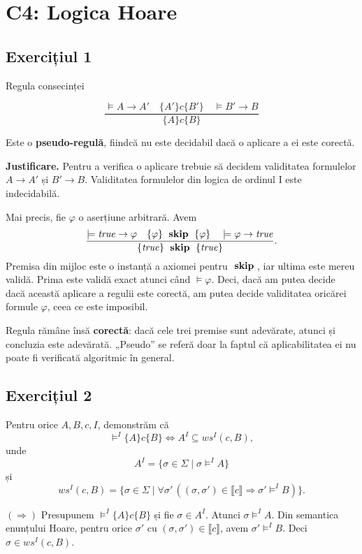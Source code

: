 \section*{C4: Logica Hoare}

\subsection{Exercițiul 1}

Regula consecinței

\[
	\frac{\models A \rightarrow A' \quad \{A'\} c \{B'\} \quad \models B' \rightarrow B}{\{A\} c \{B\}}
\]

Este o \textbf{pseudo-regulă}, fiindcă nu este decidabil dacă o aplicare a ei
este corectă.

\textbf{Justificare.}
Pentru a verifica o aplicare trebuie să decidem validitatea formulelor
$A\rightarrow A'$ și $B'\rightarrow B$. Validitatea formulelor din logica de
ordinul I este indecidabilă.

Mai precis, fie $\varphi$ o aserțiune arbitrară. Avem
\[
	\frac{\models \mathit{true}\rightarrow\varphi
		\quad \{\varphi\}\ \;\mathrm{\mathbf{skip}}\;\ \{\varphi\}
		\quad \models\varphi\rightarrow\mathit{true}}
	{\{\mathit{true}\}\ \;\mathrm{\mathbf{skip}}\;\ \{\mathit{true}\}}.
\]
Premisa din mijloc este o instanță a axiomei pentru $\;\mathrm{\mathbf{skip}}\;$, iar ultima
este mereu validă. Prima este validă exact atunci când
$\models\varphi$. Deci, dacă am putea decide dacă această aplicare a regulii
este corectă, am putea decide validitatea oricărei formule $\varphi$, ceea ce
este imposibil.

Regula rămâne însă \textbf{corectă}: dacă cele trei premise sunt adevărate,
atunci și concluzia este adevărată. „Pseudo” se referă doar la faptul că
aplicabilitatea ei nu poate fi verificată algoritmic în general.

\subsection{Exercițiul 2}

Pentru orice $A,B,c,I$, demonstrăm că
\[
	\models^I\{A\}c\{B\}
	\iff
	A^I\subseteq ws^I(c,B),
\]
unde
\[
	A^I=\{\sigma\in\Sigma\mid \sigma\models^I A\}
\]
și
\[
	ws^I(c,B)=
	\{\sigma\in\Sigma\mid
	\forall\sigma'\,((\sigma,\sigma')\in\llbracket c\rrbracket
	\Rightarrow \sigma'\models^I B)\}.
\]

\textbf{$(\Rightarrow)$}
Presupunem $\models^I\{A\}c\{B\}$ și fie $\sigma\in A^I$.
Atunci $\sigma\models^I A$. Din semantica enunțului Hoare, pentru orice
$\sigma'$ cu $(\sigma,\sigma')\in\llbracket c\rrbracket$, avem
$\sigma'\models^I B$. Deci $\sigma\in ws^I(c,B)$.

